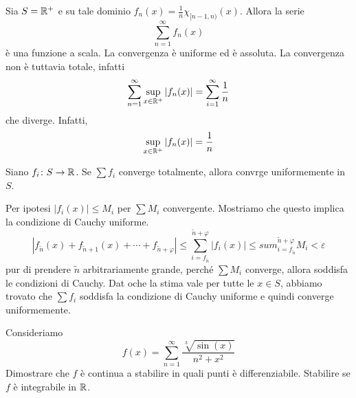 \documentclass[a4paper]{article}
\begin{document}
\begin{snippetexample}{}
    Sia \(S = \mathbb{R}^+\) e su tale dominio \(f_n(x) = \frac1n\chi_{[n-1, n)}(x)\). Allora la serie
    \[
        \sum_{n=1}^\infty f_n(x)
    \]
    è una funzione a scala. La convergenza è uniforme ed è assoluta.
    La convergenza non è tuttavia totale, infatti
    \[
        \sum_{n=1}^\infty \sup_{x \in \mathbb{R}^+} |f_n(x)| = \sum_{i=1}^\infty \frac1n
    \]
    che diverge. Infatti,
    \[
        \sup_{x \in \mathbb{R}^+} |f_n(x)| = \frac1n
    \]
\end{snippetexample}

\begin{snippetproposition}{}
    Siano \(f_i \colon S \to \mathbb{R}\). Se \(\sum f_i\) converge totalmente, allora convrge uniformemente in \(S\).
\end{snippetproposition}

\begin{snippetproof}{}
    Per ipotesi \(|f_i(x)| \leq M_i\) per \(\sum M_i\) convergente.
    Mostriamo che questo implica la condizione di Cauchy uniforme.
    \[
        |f_{\tilde n}(x) + f_{{\tilde n} + 1}(x) + \cdots + f_{{\tilde n} + \varphi}| \leq
        \sum_{i=f_{\tilde n}}^{{\tilde n} + \varphi} |f_i(x)| \leq 
        sum_{i=f_{\tilde n}}^{{\tilde n} + \varphi} M_i < \varepsilon
    \]
    pur di prendere \(\tilde n\) arbitrariamente grande, perché
    \(\sum M_i\) converge, allora soddisfa le condizioni di Cauchy.
    Dat oche la stima vale per tutte le \(x\in S\), abbiamo trovato che \(\sum f_i\) soddisfa la condizione di Cauchy
    uniforme e quindi converge uniformemente.
\end{snippetproof}

\begin{snippetexercise}{}
    Consideriamo \[
        f(x) = \sum_{n=1}^\infty \frac{
            \sqrt[3]{\sin(x)}
        }{
            n^2 + x^2
        }
    \]
    Dimostrare che \(f\) è continua a stabilire in quali punti è differenziabile.
    Stabilire se \(f\) è integrabile in \(\mathbb{R}\). 
\end{snippetexercise}
\end{document}
